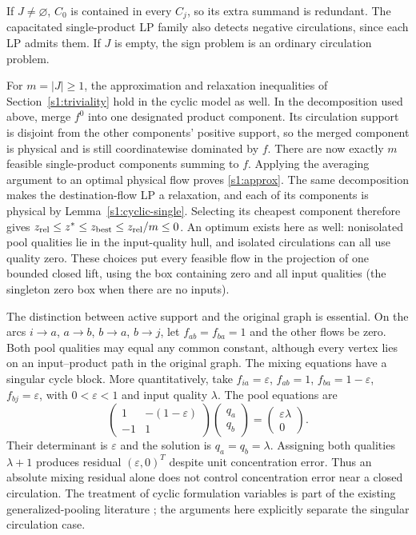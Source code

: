 If $J\ne\varnothing$, $C_0$ is contained in every $C_j$, so its extra
summand is redundant. The capacitated single-product LP family also
detects negative circulations, since each LP admits them. If $J$ is
empty, the sign problem is an ordinary circulation problem.

For $m=|J|\ge1$, the approximation and relaxation inequalities of
Section~\ref{s1:triviality} hold in the cyclic model as well. In the
decomposition used above, merge $f^0$ into one designated product
component. Its circulation support is disjoint from the other components'
positive support, so the merged component is physical and is still
coordinatewise dominated by $f$. There are now exactly $m$ feasible
single-product components summing to $f$. Applying the averaging argument
to an optimal physical flow proves \eqref{s1:approx}. The same
decomposition makes the destination-flow LP a relaxation, and each of
its components is physical by Lemma~\ref{s1:cyclic-single}. Selecting
its cheapest component therefore gives
$z_{\rm rel}\le z^*\le z_{\rm best}\le z_{\rm rel}/m\le0$.
An optimum exists here as well: nonisolated pool qualities lie in the
input-quality hull, and isolated circulations can all use quality zero.
These choices put every feasible flow in the projection of one bounded
closed lift, using the box containing zero and all input qualities
(the singleton zero box when there are no inputs).

The distinction between active support and the original graph is
essential. On the arcs $i\to a$, $a\to b$, $b\to a$, $b\to j$, let
$f_{ab}=f_{ba}=1$ and the other flows be zero. Both pool qualities may
equal any common constant, although every vertex lies on an
input--product path in the original graph. The mixing equations have
a singular cycle block. More quantitatively, take
$f_{ia}=\varepsilon$, $f_{ab}=1$, $f_{ba}=1-\varepsilon$,
$f_{bj}=\varepsilon$, with $0<\varepsilon<1$ and input quality $\lambda$.
The pool equations are
\[
 \begin{pmatrix}1&-(1-\varepsilon)\\-1&1\end{pmatrix}
 \begin{pmatrix}q_a\\q_b\end{pmatrix}
 =\begin{pmatrix}\varepsilon\lambda\\0\end{pmatrix}.
\]
Their determinant is $\varepsilon$ and the solution is
$q_a=q_b=\lambda$. Assigning both qualities $\lambda+1$ produces residual
$(\varepsilon,0)^T$ despite unit concentration error. Thus an absolute
mixing residual alone does not control concentration error near a
closed circulation. The treatment of cyclic formulation variables is
part of the existing generalized-pooling literature
\citep{boland2016-new-multi-commodity-flow-formulations}; the arguments
here explicitly separate the singular circulation case.

